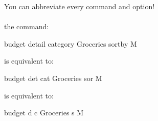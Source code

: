\documentclass[12pt,letterpaper]{article}
\begin{document}
\begin{framed}
    \begin{minipage}[t][3in][t]{5in}
\end{minipage}
\end{framed}
\Large
\begin{framed}
    \begin{minipage}[t][3in][t]{5in}
        You can abbreviate every command and option! \\ \\
        the command:
        \begin{budget}
            budget detail category Groceries sortby M
        \end{budget}
        is equivalent to: 
        \begin{budget}
            budget det cat Groceries sor M
        \end{budget}
        is equivalent to: 
        \begin{budget}
            budget d c Groceries s M
        \end{budget}
    \end{minipage}
\end{framed}
\end{document}
